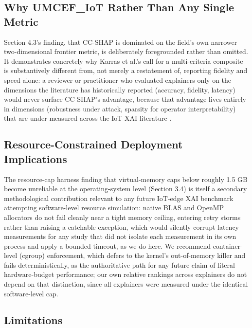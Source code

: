 \subsection{Why UMCEF\_IoT Rather Than Any Single Metric}\label{why-umcef_iot-rather-than-any-single-metric}

Section 4.3's finding, that CC-SHAP is dominated on the field's own narrower two-dimensional frontier metric, is deliberately foregrounded rather than omitted. It demonstrates concretely why Karras et al.'s \citep{ref1} call for a multi-criteria composite is substantively different from, not merely a restatement of, reporting fidelity and speed alone: a reviewer or practitioner who evaluated explainers only on the dimensions the literature has historically reported (accuracy, fidelity, latency) would never surface CC-SHAP's advantage, because that advantage lives entirely in dimensions (robustness under attack, sparsity for operator interpretability) that are under-measured across the IoT-XAI literature \citep{ref1,ref7}.

\subsection{Resource-Constrained Deployment Implications}\label{resource-constrained-deployment-implications}

The resource-cap harness finding that virtual-memory caps below roughly 1.5 GB become unreliable at the operating-system level (Section 3.4) is itself a secondary methodological contribution relevant to any future IoT-edge XAI benchmark attempting software-level resource simulation: native BLAS and OpenMP allocators do not fail cleanly near a tight memory ceiling, entering retry storms rather than raising a catchable exception, which would silently corrupt latency measurements for any study that did not isolate each measurement in its own process and apply a bounded timeout, as we do here. We recommend container-level (cgroup) enforcement, which defers to the kernel's out-of-memory killer and fails deterministically, as the authoritative path for any future claim of literal hardware-budget performance; our own relative rankings across explainers do not depend on that distinction, since all explainers were measured under the identical software-level cap.

\subsection{Limitations}\label{limitations}

